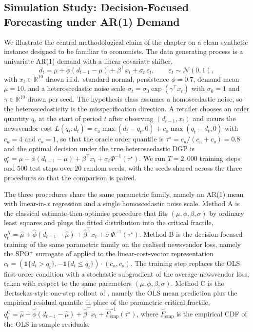 \subsection{Simulation Study: Decision-Focused Forecasting under AR(1) Demand}
\label{sec:forecasting_rl_sim}

We illustrate the central methodological claim of the chapter on a clean
synthetic instance designed to be familiar to economists. The data generating
process is a univariate AR(1) demand with a linear covariate shifter,
\begin{equation}
d_t = \mu + \phi (d_{t-1} - \mu) + \beta^\top x_t + \sigma_t\,\varepsilon_t,
\qquad \varepsilon_t \sim \mathcal N(0, 1),
\label{eq:ar1_dgp}
\end{equation}
with $x_t \in \mathbb R^{10}$ drawn i.i.d.\ standard normal, persistence
$\phi = 0.7$, demand mean $\mu = 10$, and a heteroscedastic noise scale
$\sigma_t = \sigma_0 \exp(\gamma^\top x_t)$ with $\sigma_0 = 1$ and
$\gamma \in \mathbb R^{10}$ drawn per seed. The hypothesis class assumes a
homoscedastic noise, so the heteroscedasticity is the misspecification
direction. A retailer chooses an order quantity $q_t$ at the start of period
$t$ after observing $(d_{t-1}, x_t)$ and incurs the newsvendor cost
$L(q_t, d_t) = c_u \max(d_t - q_t, 0) + c_o \max(q_t - d_t, 0)$
with $c_u = 4$ and $c_o = 1$, so that the oracle order quantile is
$\tau^\star = c_u / (c_u + c_o) = 0.8$ and the optimal decision under the
true heteroscedastic DGP is
$q^\star_t = \mu + \phi (d_{t-1} - \mu) + \beta^\top x_t + \sigma_t
\Phi^{-1}(\tau^\star)$. We run $T = 2{,}000$ training steps and $500$ test
steps over $20$ random seeds, with the seeds shared across the three
procedures so that the comparison is paired.

The three procedures share the same parametric family, namely an AR(1)
mean with linear-in-$x$ regression and a single homoscedastic noise scale.
Method A is the classical estimate-then-optimise procedure that fits
$(\mu, \phi, \beta, \sigma)$ by ordinary least squares and plugs the fitted
distribution into the critical fractile,
$q^{\mathrm A}_t = \hat\mu + \hat\phi (d_{t-1} - \hat\mu)
+ \hat\beta^\top x_t + \hat\sigma\,\Phi^{-1}(\tau^\star)$.
Method B is the decision-focused training of the same parametric family on the
realised newsvendor loss, namely the SPO$^+$ surrogate of
\citet{ElmachtoubGrigas2022} applied to the linear-cost-vector representation
$c_t = (\mathbf 1\{d_t > q_t\}, -\mathbf 1\{d_t \le q_t\}) \cdot (c_u, c_o)$.
The training step replaces the OLS first-order condition with a stochastic
subgradient of the average newsvendor loss, taken with respect to the same
parameters $(\mu, \phi, \beta, \sigma)$. Method C is the Bertsekas-style
one-step rollout of \citet{BertsekasRollout2022}, namely the OLS mean
prediction plus the empirical residual quantile in place of the parametric
critical fractile, $q^{\mathrm C}_t = \hat\mu + \hat\phi (d_{t-1} - \hat\mu)
+ \hat\beta^\top x_t + \hat F^{-1}_{\mathrm{emp}}(\tau^\star)$, where
$\hat F_{\mathrm{emp}}$ is the empirical CDF of the OLS in-sample residuals.

